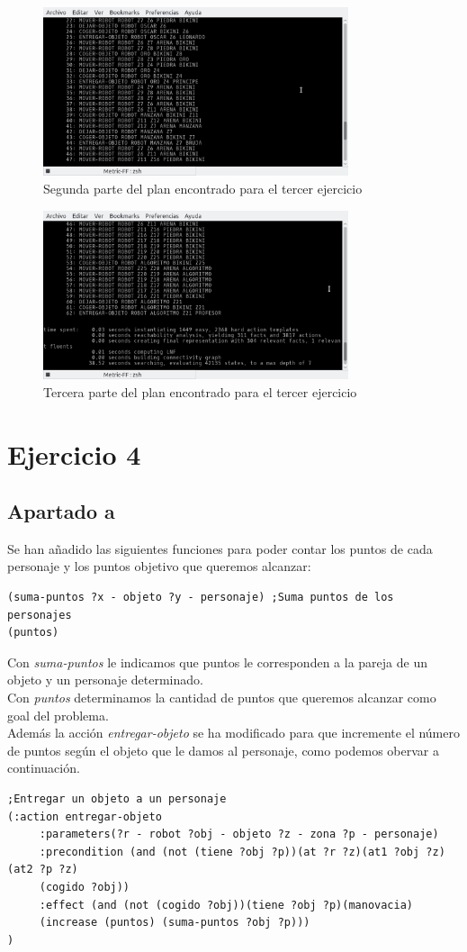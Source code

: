 \begin{figure}[H]
	\centering
	\includegraphics[width=0.8\textwidth]{img6}
	\caption{Segunda parte del plan encontrado para el tercer ejercicio}
\end{figure}
\begin{figure}[H]
	\centering
	\includegraphics[width=0.8\textwidth]{img7}
	\caption{Tercera parte del plan encontrado para el tercer ejercicio}
\end{figure}
\section{Ejercicio 4}
\subsection{Apartado a}
Se han añadido las siguientes funciones para poder contar los puntos de cada personaje y los puntos objetivo que queremos alcanzar:
\begin{verbatim}
(suma-puntos ?x - objeto ?y - personaje) ;Suma puntos de los personajes
(puntos)
\end{verbatim}
Con \textit{suma-puntos} le indicamos que puntos le corresponden a la pareja de un objeto y un personaje determinado.\\
Con \textit{puntos} determinamos la cantidad de puntos que queremos alcanzar como goal del problema.\\
Además la acción \textit{entregar-objeto} se ha modificado para que incremente el número de puntos según el objeto que le damos al personaje, como podemos obervar a continuación. 
\begin{verbatim}
;Entregar un objeto a un personaje
(:action entregar-objeto
     :parameters(?r - robot ?obj - objeto ?z - zona ?p - personaje)
     :precondition (and (not (tiene ?obj ?p))(at ?r ?z)(at1 ?obj ?z)(at2 ?p ?z)
     (cogido ?obj))
     :effect (and (not (cogido ?obj))(tiene ?obj ?p)(manovacia)
     (increase (puntos) (suma-puntos ?obj ?p)))
)
\end{verbatim}
